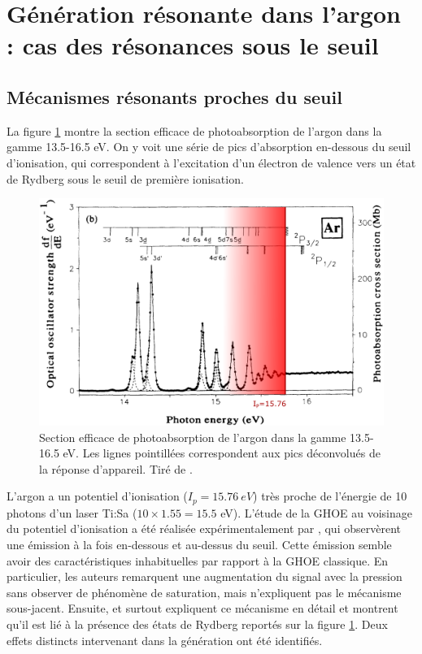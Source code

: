 \section{Génération résonante dans l'argon : cas des résonances sous le seuil}
\subsection{Mécanismes résonants proches du seuil}
La figure \ref{fig:ArIp} montre la section efficace de photoabsorption de l'argon dans la gamme 13.5-16.5 eV. On y voit une série de pics d'absorption en-dessous du seuil d'ionisation, qui correspondent à l'excitation d'un électron de valence vers un état de Rydberg sous le seuil de première ionisation.

\begin{figure}[!ht]
\centering
\includegraphics[width=0.9\columnwidth]{Figures/ResonantArgon/argon_spectrum.png}%
\caption{Section efficace de photoabsorption de l'argon dans la gamme 13.5-16.5 eV. Les lignes pointillées correspondent aux pics déconvolués de la réponse d'appareil. Tiré de .}
\label{fig:ArIp}%
\end{figure}

L'argon a un potentiel d'ionisation ($I_p = \SI{15.76}{eV}$) très proche de l'énergie de 10 photons d'un laser\shorthandoff{:} Ti:Sa \shorthandon{:}($10\times 1.55 = 15.5$ eV). L'étude de la GHOE au voisinage du potentiel d'ionisation a été réalisée expérimentalement par , qui observèrent une émission à la fois en-dessous et au-dessus du seuil. Cette émission semble avoir des caractéristiques inhabituelles par rapport à la GHOE classique. En particulier, les auteurs remarquent une augmentation du signal avec la pression sans observer de phénomène de saturation, mais n'expliquent pas le mécanisme sous-jacent. Ensuite,  et surtout  expliquent ce mécanisme en détail et montrent qu'il est lié à la présence des états de Rydberg reportés sur la figure \ref{fig:ArIp}. Deux effets distincts intervenant dans la génération ont été identifiés.

